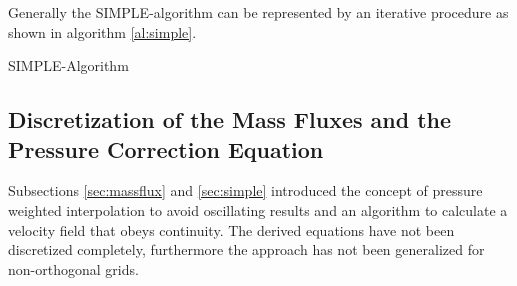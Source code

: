 Generally the SIMPLE-algorithm can be represented by an iterative procedure as shown in algorithm \ref{al:simple}.
\begin{algorithm}
\label{al:simple}
\caption{SIMPLE-Algorithm}
\begin{algorithmic}
  \EndIf
\EndWhile
{}
  \EndIf
\end{algorithmic}
\end{algorithm}

\subsection{Discretization of the Mass Fluxes and the Pressure Correction Equation}
\label{sec:segpresscorr}

Subsections \ref{sec:massflux} and \ref{sec:simple} introduced the concept of pressure weighted interpolation to avoid oscillating results and an algorithm to calculate a velocity field that obeys continuity. The derived equations have not been discretized completely, furthermore the approach has not been generalized for non-orthogonal grids.

